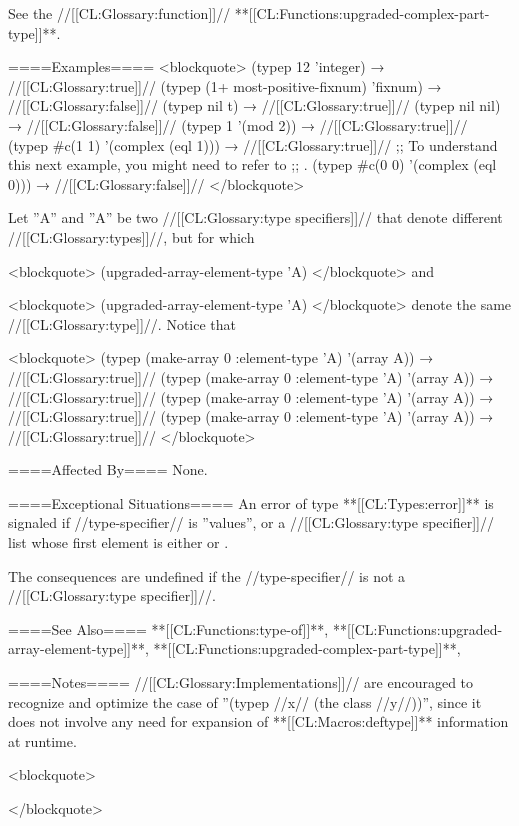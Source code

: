 See the //[[CL:Glossary:function]]// **[[CL:Functions:upgraded-complex-part-type]]**.

====Examples====
<blockquote> (typep 12 'integer) → //[[CL:Glossary:true]]// (typep (1+ most-positive-fixnum) 'fixnum) → //[[CL:Glossary:false]]// (typep nil t) → //[[CL:Glossary:true]]// (typep nil nil) → //[[CL:Glossary:false]]// (typep 1 '(mod 2)) → //[[CL:Glossary:true]]// (typep #c(1 1) '(complex (eql 1))) → //[[CL:Glossary:true]]// ;; To understand this next example, you might need to refer to ;; \secref\RuleOfCanonRepForComplexRationals. (typep #c(0 0) '(complex (eql 0))) → //[[CL:Glossary:false]]// </blockquote>

Let ''A\sssx'' and ''A\sssy'' be two //[[CL:Glossary:type specifiers]]// that denote different //[[CL:Glossary:types]]//, but for which

<blockquote> (upgraded-array-element-type 'A\sssx) </blockquote> and

<blockquote> (upgraded-array-element-type 'A\sssy) </blockquote> denote the same //[[CL:Glossary:type]]//. Notice that

<blockquote> (typep (make-array 0 :element-type 'A\sssx) '(array A\sssx)) → //[[CL:Glossary:true]]// (typep (make-array 0 :element-type 'A\sssy) '(array A\sssy)) → //[[CL:Glossary:true]]// (typep (make-array 0 :element-type 'A\sssx) '(array A\sssy)) → //[[CL:Glossary:true]]// (typep (make-array 0 :element-type 'A\sssy) '(array A\sssx)) → //[[CL:Glossary:true]]// </blockquote>


====Affected By====
None.

====Exceptional Situations====
An error of type **[[CL:Types:error]]** is signaled if //type-specifier// is ''values'', or a //[[CL:Glossary:type specifier]]// list whose first element is either  or .

The consequences are undefined if the //type-specifier// is not a //[[CL:Glossary:type specifier]]//.

====See Also====
**[[CL:Functions:type-of]]**, **[[CL:Functions:upgraded-array-element-type]]**, **[[CL:Functions:upgraded-complex-part-type]]**, {\secref\TypeSpecifiers}

====Notes====
//[[CL:Glossary:Implementations]]// are encouraged to recognize and optimize the case of ''(typep //x// (the class //y//))'', since it does not involve any need for expansion of **[[CL:Macros:deftype]]** information at runtime.

<blockquote>

</blockquote>

   
